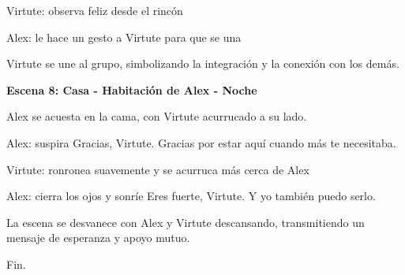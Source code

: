 \documentclass{article}
\begin{document}
Virtute: observa feliz desde el rincón

Alex: le hace un gesto a Virtute para que se una

Virtute se une al grupo, simbolizando la integración y la conexión con los demás.

\textbf{\large Escena 8: Casa - Habitación de Alex - Noche}

Alex se acuesta en la cama, con Virtute acurrucado a su lado.

Alex: suspira Gracias, Virtute. Gracias por estar aquí cuando más te necesitaba.

Virtute: ronronea suavemente y se acurruca más cerca de Alex

Alex: cierra los ojos y sonríe Eres fuerte, Virtute. Y yo también puedo serlo.

La escena se desvanece con Alex y Virtute descansando, transmitiendo un mensaje de esperanza y apoyo mutuo.



Fin.
\newpage





\end{document}
